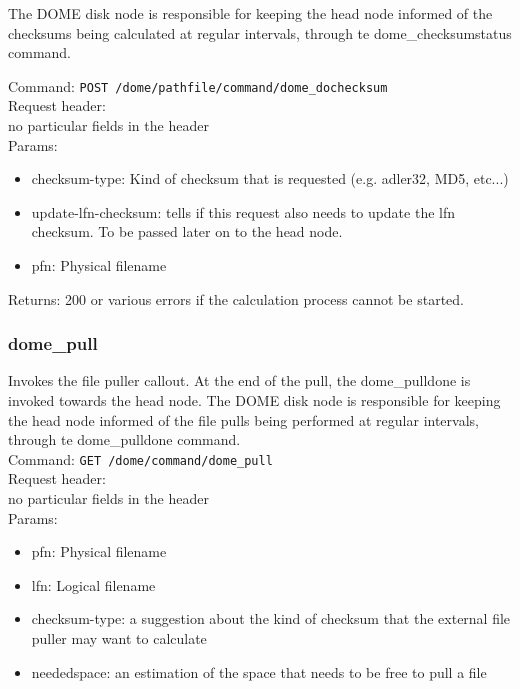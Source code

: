 \documentclass[a4paper,10pt]{scrreprt}
\begin{document}
 The DOME disk node is responsible for keeping the head node
 informed of the checksums being calculated at regular intervals,
 through te dome\_checksumstatus command.

Command:
\lstinline"POST /dome/pathfile/command/dome_dochecksum"\\

Request header:\\
no particular fields in the header\\

Params:
\begin{itemize}
 \item checksum-type: Kind of checksum that is requested (e.g. adler32, MD5, etc...)
 \item update-lfn-checksum: tells if this request also needs to update the lfn checksum. To be passed later on to the head node.
 \item pfn: Physical filename
\end{itemize}

Returns: 200 or various errors if the calculation process cannot be started.


\subsubsection{dome\_pull}
 Invokes the file puller callout. At the end of the pull, the dome\_pulldone is invoked towards the head node.
 The DOME disk node is responsible for keeping the head node
 informed of the file pulls being performed at regular intervals,
 through te dome\_pulldone command.\\



Command:
\lstinline"GET /dome/command/dome_pull"\\

Request header:\\
no particular fields in the header\\

Params:
\begin{itemize}
 \item pfn: Physical filename
 \item lfn: Logical filename
 \item checksum-type: a suggestion about the kind of checksum that the external file puller may want to calculate
 \item neededspace: an estimation of the space that needs to be free to pull a file
\end{itemize}
\end{document}
